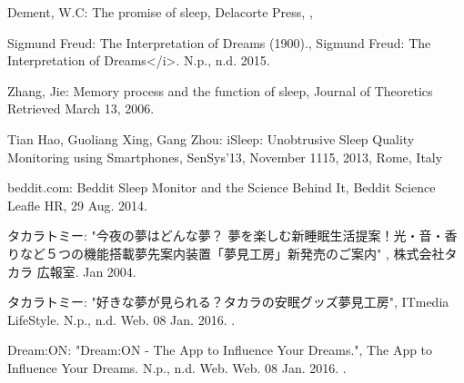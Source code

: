 \begin{bib}[100]
\begin{flushleft}
  Dement, W.C:
  \newblock  The promise of sleep,
  \newblock Delacorte Press,
  ,
 \end{flushleft}
 
\begin{flushleft}
  Sigmund Freud:
  \newblock The Interpretation of Dreams (1900).,
  \newblock Sigmund Freud: The Interpretation of Dreams</i>. N.p., n.d. 2015.
\end{flushleft}
 
\begin{flushleft}
 Zhang, Jie:
  \newblock Memory process and the function of sleep,
  \newblock Journal of Theoretics Retrieved March 13, 2006.
 \end{flushleft}
 
\begin{flushleft}
  Tian Hao, Guoliang Xing, Gang Zhou:
  \newblock  iSleep: Unobtrusive Sleep Quality Monitoring using Smartphones,
  \newblock SenSys’13,
  \newblock  November 1115, 2013, Rome, Italy
\end{flushleft}

\begin{flushleft}
  beddit.com:
  \newblock Beddit Sleep Monitor and the Science Behind It,
  \newblock Beddit Science Leafle HR, 29 Aug. 2014.
\end{flushleft}
  
\begin{flushleft}
  タカラトミー:
  \newblock "今夜の夢はどんな夢？ 夢を楽しむ新睡眠生活提案！光・音・香りなど５つの機能搭載夢先案内装置「夢見工房」新発売のご案内" ,
  \newblock 株式会社タカラ 広報室.
   Jan 2004.
\end{flushleft}

\begin{flushleft}
  タカラトミー:
  \newblock "好きな夢が見られる？タカラの安眠グッズ夢見工房",
  \newblock ITmedia LifeStyle. N.p., n.d.
  \newblock Web. 08 Jan. 2016.
  .
\end{flushleft}

\begin{flushleft}
  Dream:ON:
  \newblock "Dream:ON - The App to Influence Your Dreams.",
  \newblock The App to Influence Your Dreams. N.p., n.d. Web.
  \newblock Web. 08 Jan. 2016.
  .
\end{flushleft}


\end{bib}
